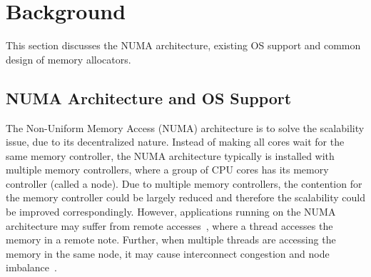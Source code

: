 \section{Background}
\label{sec:background}

This section discusses the NUMA architecture, existing OS support and common design of memory allocators.

\subsection{NUMA Architecture and OS Support}

\label{sec:numa}


The Non-Uniform Memory Access (NUMA) architecture is to solve the scalability issue, due to its decentralized nature. Instead of making all cores wait for the same memory controller, the NUMA architecture typically is installed with multiple memory controllers, where a group of CPU cores has its memory controller (called a node). 
Due to multiple memory controllers, the contention for the memory controller could be largely reduced and therefore the scalability could be improved correspondingly. However, applications running on the NUMA architecture may suffer from remote accesses~\cite{Blagodurov:2011:CNC:2002181.2002182}, where a thread accesses the memory in a remote note. Further, when multiple threads are accessing the memory in the same node, it may cause interconnect congestion and node imbalance~\cite{Blagodurov:2011:CNC:2002181.2002182}.  

 
